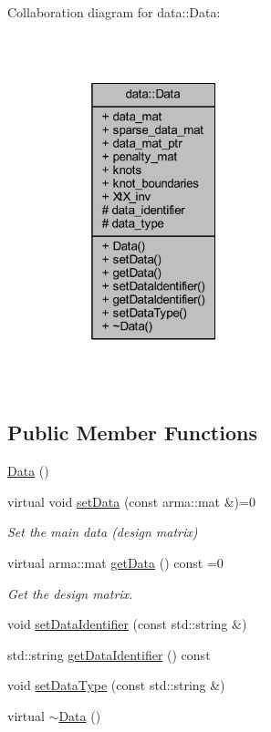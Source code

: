 Collaboration diagram for data\+:\+:Data\+:\nopagebreak
\begin{figure}[H]
\begin{center}
\leavevmode
\includegraphics[width=181pt]{classdata_1_1_data__coll__graph}
\end{center}
\end{figure}
\subsection*{Public Member Functions}
\begin{DoxyCompactItemize}
\item 
\mbox{\hyperlink{classdata_1_1_data_ae571957bf5380fe4b3233dd799063f1e}{Data}} ()
\item 
virtual void \mbox{\hyperlink{classdata_1_1_data_a0e928c49b31f803e7984cc24e2f73f70}{set\+Data}} (const arma\+::mat \&)=0
\begin{DoxyCompactList}\small\item\em Set the main data (design matrix) \end{DoxyCompactList}\item 
virtual arma\+::mat \mbox{\hyperlink{classdata_1_1_data_aa4073af1bc8ccc7c50809e1676436eb4}{get\+Data}} () const =0
\begin{DoxyCompactList}\small\item\em Get the design matrix. \end{DoxyCompactList}\item 
void \mbox{\hyperlink{classdata_1_1_data_a62bcea680e1a7d1d4ecec60c111936dc}{set\+Data\+Identifier}} (const std\+::string \&)
\item 
std\+::string \mbox{\hyperlink{classdata_1_1_data_a1af63a4e5aa708de31e1ffdd727a4e16}{get\+Data\+Identifier}} () const
\item 
void \mbox{\hyperlink{classdata_1_1_data_a349569c170c7e8b78bf4997b47e3f1a8}{set\+Data\+Type}} (const std\+::string \&)
\item 
virtual \mbox{\hyperlink{classdata_1_1_data_a737d2c889ffb7c08d60b5af5846b586b}{$\sim$\+Data}} ()
\end{DoxyCompactItemize}
